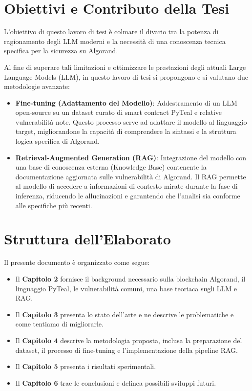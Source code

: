 \section{Obiettivi e Contributo della Tesi}
L'obiettivo di questo lavoro di tesi è colmare il divario tra la potenza di ragionamento degli LLM moderni e la necessità di una conoscenza tecnica specifica per la sicurezza su Algorand. 

Al fine di superare tali limitazioni e ottimizzare le prestazioni degli attuali Large Language Models (LLM), in questo lavoro di tesi si propongono e si valutano due metodologie avanzate:

\begin{itemize}
    \item \textbf{Fine-tuning (Adattamento del Modello)}: Addestramento di un LLM open-source su un dataset curato di smart contract PyTeal e relative vulnerabilità note. Questo processo serve ad adattare il modello al linguaggio target, migliorandone la capacità di comprendere la sintassi e la struttura logica specifica di Algorand.
    
    \item \textbf{Retrieval-Augmented Generation (RAG)}: Integrazione del modello con una base di conoscenza esterna (Knowledge Base) contenente la documentazione aggiornata sulle vulnerabilità di Algorand. Il RAG permette al modello di accedere a informazioni di contesto mirate durante la fase di inferenza, riducendo le allucinazioni e garantendo che l'analisi sia conforme alle specifiche più recenti.
\end{itemize}

\section{Struttura dell'Elaborato}
Il presente documento è organizzato come segue:
\begin{itemize}
    \item Il \textbf{Capitolo 2} fornisce il background necessario sulla blockchain Algorand, il linguaggio PyTeal, le vulnerabilità comuni, una base teoriaca sugli LLM e RAG.
    \item Il \textbf{Capitolo 3} presenta lo stato dell'arte e ne descrive le problematiche e come tentiamo di migliorarle.
    \item Il \textbf{Capitolo 4} descrive la metodologia proposta, inclusa la preparazione del dataset, il processo di fine-tuning e l'implementazione della pipeline RAG.
    \item Il \textbf{Capitolo 5} presenta i risultati sperimentali.
    \item Il \textbf{Capitolo 6} trae le conclusioni e delinea possibili sviluppi futuri.
\end{itemize}